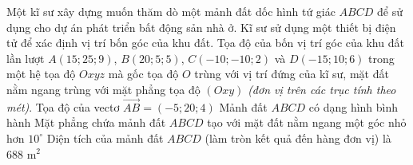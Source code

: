 \begin{ex}%
	Một kĩ sư xây dựng muốn thăm dò một mảnh đất dốc hình tứ giác $ABCD$ để sử dụng cho dự án phát triển bất động sản nhà ở. Kĩ sư sử dụng một thiết bị điện tử để xác định vị trí bốn góc của khu đất. Tọa độ của bốn vị trí góc của khu đất lần lượt $A(15; 25; 9)$, $B(20; 5; 5)$, $C(-10; -10; 2)$ và $D(-15; 10; 6)$ trong một hệ tọa độ $Oxyz$ mà gốc tọa độ $O$ trùng với vị trí đứng của kĩ sư, mặt đất nằm ngang trùng với mặt phẳng tọa độ $(Oxy)$ \textit{(đơn vị trên các trục tính theo mét)}.
	\choiceTF
	{Tọa độ của vectơ $\overrightarrow{AB} = (-5; 20; 4)$}
	{\True Mảnh đất $ABCD$ có dạng hình bình hành}
	{Mặt phẳng chứa mảnh đất $ABCD$ tạo với mặt đất nằm ngang một góc nhỏ hơn $10^\circ$}
	{\True Diện tích của mảnh đất $ABCD$ (làm tròn kết quả đến hàng đơn vị) là $688$ m$^2$}
\end{ex}

